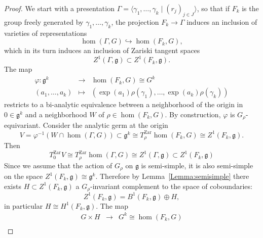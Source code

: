 \documentclass[a4paper,11pt]{article}
\begin{document}
\begin{proof}
 We start with a presentation 
 $\Gamma=\langle \gamma_1,\ldots,\gamma_k
 \mid (r_j)_{j\in J}\rangle$, so that if $F_k$ is the group freely generated by $
 \gamma_1,\ldots,\gamma_k$, the projection $F_k\to\Gamma$ induces an inclusion of varieties of representations 
 $$
 \hom (\Gamma,G)\hookrightarrow \hom(F_k,G),
 $$
 which in its turn induces an inclusion of Zariski tangent spaces
 $$
Z^1(\Gamma,\mathfrak{g})\subset
Z^1(F_k,\mathfrak{g}).
 $$
 The map
\begin{equation}
\label{eqn:Phii}
\begin{array}{rcl}
 \varphi\colon\mathfrak{g}^k &\to&\hom(F_k,G)\cong G^k \\
 (a_1,\ldots,a_k)& \mapsto & 
 (\exp(a_1)\rho(\gamma_1), \ldots
 , \exp(a_k)\rho(\gamma_k))
\end{array}
\end{equation}
restricts to a  bi-analytic equivalence  between a neighborhood
of the origin in $0\in \mathfrak{g}^k $ and 
a neighborhood $W$ of $\rho\in  \hom(F_k,G)$.
By construction, $\varphi$ is $G_\rho$-equivariant.
Consider the analytic germ at the origin
\begin{equation}
\label{eqn:V}
 V=\varphi^{-1}(W\cap \hom(\Gamma, G) )\subset \mathfrak{g}^k 
\cong
  T^{\mathrm{Zar}}_\rho\hom(F_k, G)
 \cong 
Z^1(F_k,\mathfrak{g}).
\end{equation}
 Then
 \begin{equation}
\label{eqn:tgs}
T^{\mathrm{Zar}}_0V
 \cong 
T^{\mathrm{Zar}}_\rho\hom(\Gamma, G)
 \cong 
Z^1(\Gamma,\mathfrak{g})\subset 
Z^1(F_k,\mathfrak{g})
\end{equation}
Since we assume that the action  of $G_\rho$ on $\mathfrak{g}$ is semi-simple, it is also semi-simple on
the space $Z^1(F_k,\mathfrak{g})\cong \mathfrak g^k$. Therefore 
by Lemma~\ref{Lemma:semisimple}
there exists $H\subset Z^1(F_k,\mathfrak{g})$ a $G_\rho$-invariant complement to the space of coboundaries:
$$
Z^1(F_k,\mathfrak{g})= B^1(F_k,\mathfrak{g})
\oplus H,
$$
in particular $H\cong H^1(F_k,\mathfrak{g})$.
The  map   
 $$
 \begin{array}{rcl}
   G\times H & \to &  G^k \cong \hom(F_k,G)\\

\end{array}$$
\end{proof}
\end{document}
